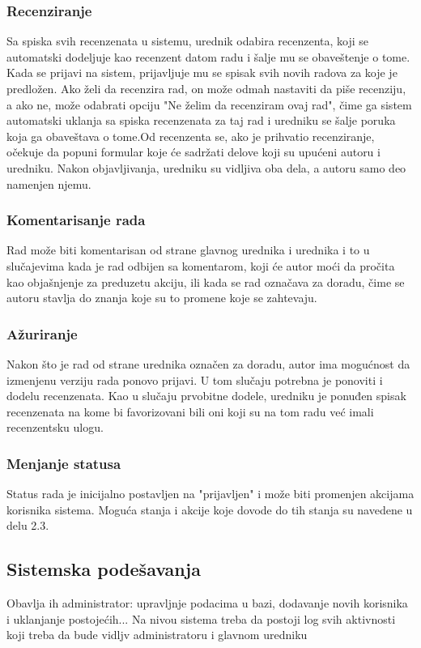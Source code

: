 \documentclass[a4paper]{article}
\begin{document}
\subsubsection{Recenziranje}
Sa spiska svih recenzenata u sistemu, urednik odabira recenzenta, koji se automatski dodeljuje kao recenzent datom radu i šalje mu se obaveštenje o tome. Kada se prijavi na sistem, prijavljuje mu se spisak svih novih radova za koje je predložen. Ako želi da recenzira rad, on može odmah nastaviti da piše recenziju, a ako ne, može odabrati opciju "Ne želim da recenziram ovaj rad", čime ga sistem automatski uklanja sa spiska recenzenata za taj rad i uredniku se šalje poruka koja ga obaveštava o tome.Od recenzenta se, ako je prihvatio recenziranje, očekuje da popuni formular koje će sadržati delove koji su upućeni autoru i uredniku. Nakon objavljivanja, uredniku su vidljiva oba dela, a autoru samo deo namenjen njemu.
\subsubsection{Komentarisanje rada}
Rad može biti komentarisan od strane glavnog urednika i urednika i to u slučajevima kada je rad odbijen sa komentarom, koji će autor moći da pročita kao objašnjenje za preduzetu akciju, ili kada se rad označava za doradu, čime se autoru stavlja do znanja koje su to promene koje se zahtevaju.
\subsubsection{Ažuriranje}
Nakon što je rad od strane urednika označen za doradu, autor ima mogućnost da izmenjenu verziju rada ponovo prijavi. U tom slučaju potrebna je ponoviti i dodelu recenzenata. Kao u slučaju prvobitne dodele, uredniku je ponuđen spisak recenzenata na kome bi favorizovani bili oni koji su na tom radu već imali recenzentsku ulogu.
\subsubsection{Menjanje statusa}
Status rada je inicijalno postavljen na "prijavljen" i može biti promenjen akcijama korisnika sistema. Moguća stanja i akcije koje dovode do tih stanja su navedene u delu 2.3.


\subsection{Sistemska podešavanja}
Obavlja ih administrator: upravljnje podacima u bazi, dodavanje novih korisnika i uklanjanje postojećih... Na nivou sistema treba da postoji log svih aktivnosti koji treba da bude vidljv administratoru i glavnom uredniku
\end{document}
